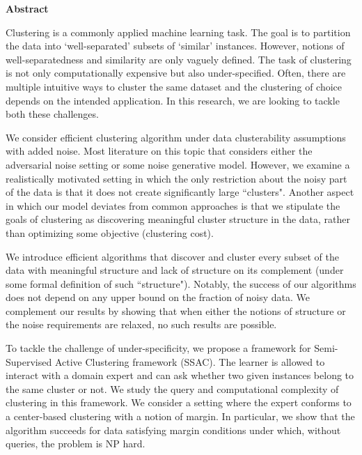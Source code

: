 \cleardoublepage %
 



\begin{center}\textbf{Abstract}\end{center}
Clustering is a commonly applied machine learning task. The goal is to partition the data into `well-separated' subsets of `similar' instances. However, notions of well-separatedness and similarity are only vaguely defined. The task of clustering is not only computationally expensive but also under-specified. Often, there are multiple intuitive ways to cluster the same dataset and the clustering of choice depends on the intended application. In this research, we are looking to tackle both these challenges. 

We consider efficient clustering algorithm under data clusterability assumptions with added noise. Most literature on this topic that considers either the adversarial noise setting or some noise generative model. However, we examine a realistically motivated setting in which the only restriction about the noisy part of the data is that it does not create significantly large ``clusters". Another aspect in which our model deviates from common approaches is that we stipulate the goals of clustering as discovering meaningful cluster structure in the data, rather than optimizing some objective (clustering cost).

We introduce efficient algorithms that discover and cluster every subset of the data with meaningful structure and lack of structure on its complement (under some formal definition of such ``structure"). Notably, the success of our algorithms does not depend on any upper bound on the fraction of noisy data. We complement our results by showing that when either the notions of structure or the noise requirements are relaxed, no such results are possible.

To tackle the challenge of under-specificity, we propose a framework for Semi-Supervised Active Clustering framework (SSAC). The learner is allowed to interact with a domain expert and can ask whether two given instances belong to the same cluster or not. We study the query and computational complexity of clustering in this framework. We consider a setting where the expert conforms to a center-based clustering with a notion of margin. In particular, we show that the algorithm succeeds for data satisfying margin conditions under which, without queries, the problem is NP hard. 

